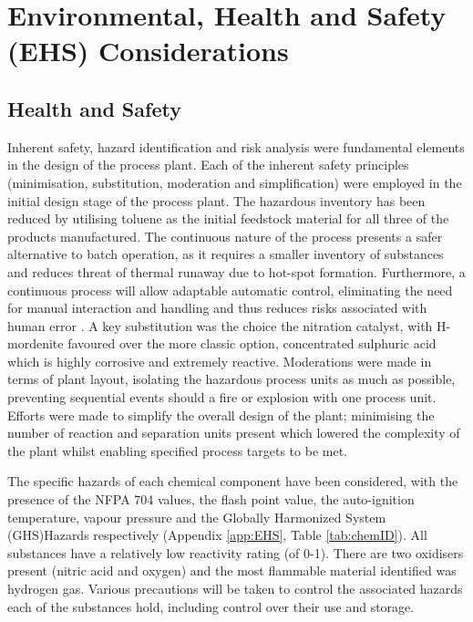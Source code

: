 \section{Environmental, Health and Safety (EHS) Considerations}
\label{sec:ehs}


\subsection{Health and Safety}

Inherent safety, hazard identification and risk analysis were fundamental elements in the design of the process plant. Each of the inherent safety principles (minimisation, substitution, moderation and simplification) were employed in the initial design stage of the process plant. The hazardous inventory has been reduced by utilising toluene as the initial feedstock material for all three of the products manufactured. The continuous nature of the process presents a safer alternative to batch operation, as it requires a smaller inventory of substances and reduces threat of thermal runaway due to hot-spot formation. Furthermore, a continuous process will allow adaptable automatic control, eliminating the need for manual interaction and handling and thus reduces risks associated with human error \cite{mannan_lees_2012}. A key substitution was the choice the nitration catalyst, with H-mordenite favoured over the more classic option, concentrated sulphuric acid which is highly corrosive and extremely reactive. Moderations were made in terms of plant layout, isolating the hazardous process units as much as possible, preventing sequential events should a fire or explosion with one process unit. Efforts were made to simplify the overall design of the plant; minimising the number of reaction and separation units present which lowered the complexity of the plant whilst enabling specified process targets to be met. 

The specific hazards of each chemical component have been considered, with the presence of the NFPA 704 values, the flash point value, the auto-ignition temperature, vapour pressure and the Globally Harmonized System (GHS)Hazards respectively (Appendix \ref{app:EHS}, Table \ref{tab:chemID}). All substances have a relatively low reactivity rating (of 0-1). There are two oxidisers present (nitric acid and oxygen) and the most flammable material identified was hydrogen gas.  Various precautions will be taken to control the associated hazards each of the substances hold, including control over their use and storage.  

